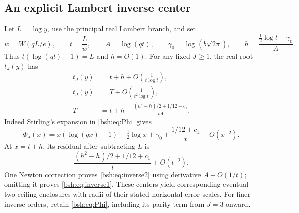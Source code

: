 \documentclass[11pt,letterpaper]{article}
\theoremstyle{remark}\newtheorem{remark}[theorem]{Remark}
\begin{document}
\subsection{An explicit Lambert inverse center}
Let $L=\log y$, use the principal real Lambert branch, and set
\begin{equation}\label{bsh:eq:lambert}
 w=W(qL/e),\qquad t=\frac Lw,\qquad A=\log(qt),\qquad
 \gamma_0=\log(b\sqrt{2\pi}),\qquad
 h=\frac{\tfrac12\log t-\gamma_0}{A}.
\end{equation}
Thus $t(\log(qt)-1)=L$ and $h=O(1)$. For any fixed $J\geq1$, the real root $t_J(y)$ has
\begin{align}
 t_J(y)&=t+h+O\left(\frac1{t\log t}\right),\label{bsh:eq:inverse1}\\
 t_J(y)&=T+O\left(\frac1{t^2\log t}\right),\label{bsh:eq:inverse2}\\
 T&=t+h-\frac{(h^2-h)/2+1/12+c_1}{tA}.\nonumber
\end{align}
Indeed Stirling's expansion in \eqref{bsh:eq:Phi} gives
\[
 \Phi_J(x)=x(\log(qx)-1)-\tfrac12\log x+\gamma_0
              +\frac{1/12+c_1}{x}+O(x^{-2}).
\]
At $x=t+h$, its residual after subtracting $L$ is
\[
 \frac{(h^2-h)/2+1/12+c_1}{t}+O(t^{-2}).
\]
One Newton correction proves \eqref{bsh:eq:inverse2} using derivative $A+O(1/t)$; omitting it proves \eqref{bsh:eq:inverse1}. These centers yield corresponding eventual two-ceiling enclosures with radii of their stated horizontal error scales. For finer inverse orders, retain \eqref{bsh:eq:Phi}, including its parity term from $J=3$ onward.
\end{document}
